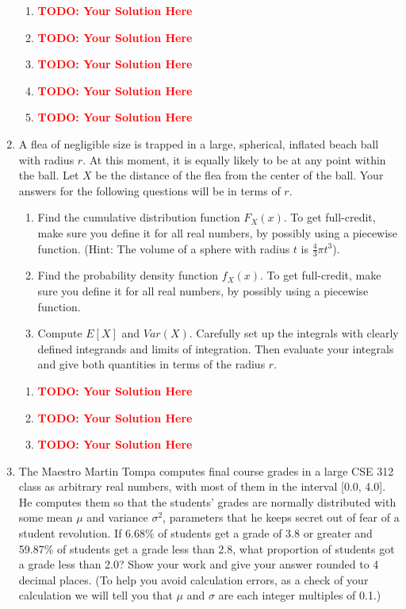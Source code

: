 \documentclass[12pt]{article}
\def\todo#1{\textcolor{red}{\textbf{#1}}}
\renewcommand{\|}{\mid}
\begin{document}
\begin{enumerate}
\begin{tcolorbox}
\begin{enumerate}
\item \todo{TODO: Your Solution Here}
\item \todo{TODO: Your Solution Here}
\item \todo{TODO: Your Solution Here}
\item \todo{TODO: Your Solution Here}
\item \todo{TODO: Your Solution Here}
\end{enumerate}
\end{tcolorbox}

\item A flea of negligible size is trapped in a large, spherical,
  inflated beach ball with radius $r$.  At this moment, it is equally
  likely to be at any point within the ball.  Let $X$ be the distance
  of the flea from the center of the ball. Your answers for the 
  following questions will be in terms of $r$. 
\begin{enumerate}
\item Find the cumulative distribution function $F_X(x)$. To get full-credit, make sure you define it for all real numbers, by possibly using a piecewise function. (Hint: The volume of a sphere with radius $t$ is $\frac{4}{3}\pi t^3$).
\item Find the probability density function $f_X(x)$. To get full-credit, make sure you define it for all real numbers, by possibly using a piecewise function.
\item Compute $E[X]$ and $Var(X)$. Carefully set up the integrals with clearly defined integrands and limits of integration. Then evaluate your integrals and give both quantities in terms of the radius $r$.
\end{enumerate}

\begin{tcolorbox}
\begin{enumerate}
\item \todo{TODO: Your Solution Here}
\item \todo{TODO: Your Solution Here}
\item \todo{TODO: Your Solution Here}
\end{enumerate}
\end{tcolorbox}

\item The Maestro Martin Tompa computes final course grades in a large CSE 312
  class as arbitrary real numbers, with most of them in the interval
  [0.0, 4.0].  He computes them so that the students' grades are
  normally distributed with some mean $\mu$ and variance $\sigma^2$,
  parameters that he keeps secret out of fear of a student revolution.
  If 6.68\% of students get a grade of 3.8 or greater and 59.87\% of
  students get a grade less than 2.8, what proportion of students
  got a grade less than 2.0? Show your work and give your answer rounded to 4 decimal places. (To help you avoid calculation
  errors, as a check of your calculation we will tell you that $\mu$
  and $\sigma$ are each integer multiples of 0.1.)


\end{enumerate}
\end{document}
